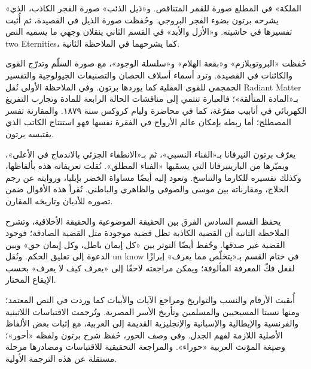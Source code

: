 
«الملكة» في المطلع صورة للقمر المتناقص. و«ذيل الذئب» صورة الفجر الكاذب، الذي يشرحه برتون بضوء الفجر البروجي. وحُفظت صورة الذيل في القصيدة، ثم أُثبت تفسيرها في حاشيته. و«الأزل والأبد» في القسم الثاني ينقلان وجهي ما يسميه النص \textenglish{two Eternities}، كما يشرحهما في الملاحظة الثانية.


حُفظت «البروتوبلازم» و«بقعة الهلام» و«سلسلة الوجود»، مع صورة السلّم وتدرّج القوى والكائنات في القصيدة. وترد أسماء أسلاف الحصان والتصنيفات الجيولوجية والتفسير الجمجمي للقوى العقلية كما يوردها برتون. وفي الملاحظة الأولى نُقل \textenglish{Radiant Matter} بـ«المادة المتألقة»؛ فالعبارة تنتمي إلى مناقشات الحالة الرابعة للمادة وتجارب التفريغ الكهربائي في أنابيب مفرّغة، كما في محاضرة وليام كروكس سنة ١٨٧٩. والمقارنة تفسر المصطلح؛ أما ربطه بإمكان عالم الأرواح في الفقرة نفسها فهو استنتاج الكاتب الذي يقتبسه برتون.


يعرّف برتون النيرفانا بـ«الفناء النسبي»، ثم بـ«الانطفاء الجزئي بالاندماج في الأعلى»، ويميّزها من البارينيرفانا التي يسمّيها «الفناء المطلق». نُقلت تعريفاته هذه بألفاظها، وكذلك تفسيره للكارما والتناسخ. وتعود إليه أيضًا مساواة الخضر بإيليا، وروايته عن رجم الحلاج، ومقارناته بين موسى والصوفي والظاهري والباطني. تُقرأ هذه الأقوال ضمن تصوره للأديان وتاريخه المقارن.


يحفظ القسم السادس الفرق بين الحقيقة الموضوعية والحقيقة الأخلاقية، وتشرح الملاحظة الثانية أن القضية الكاذبة تظل قضية موجودة مثل القضية الصادقة؛ فوجود القضية غير صدقها. وحُفظ أيضًا التوتر بين «كل إيمان باطل، وكل إيمان حق» وبين الدعوة إلى تعليق الحكم. ونُقل \textenglish{un know} في ختام القسم بـ«يتخلّص مما يعرف» إبرازًا لفعل فكّ المعرفة المألوفة؛ ويمكن مراجعته لاحقًا إلى «يعرف كيف لا يعرف» بحسب الإيقاع المختار.


أُبقيت الأرقام والنسب والتواريخ ومراجع الآيات والأبيات كما وردت في النص المعتمد؛ ومنها نسبتا المسيحيين والمسلمين وتأريخ الأسر المصرية. وتُرجمت الاقتباسات اللاتينية والفرنسية والإيطالية والإسبانية والإنجليزية القديمة إلى العربية، مع إثبات بعض الألفاظ الأصلية اللازمة لفهم الجدل. وفي وصف الحور، حُفظ شرح برتون ولفظه «أحور»؛ وصيغة المؤنث العربية «حوراء». والمراجعة التحقيقية للاقتباسات ومصادرها مرحلة مستقلة عن هذه الترجمة الأولية.
